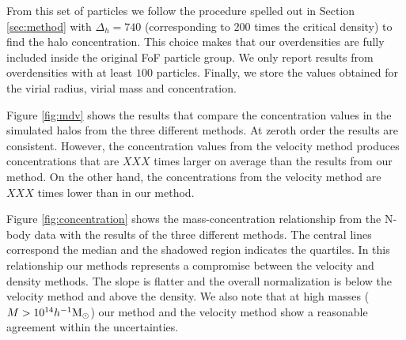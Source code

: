\documentclass{emulateapj}
\newcommand{\hMsun}{{\ifmmode{h^{-1}{\rm
        {M_{\odot}}}}\else{$h^{-1}{\rm{M_{\odot}}}$}\fi}}
\begin{document}
From this set of particles we follow the procedure spelled out in
Section \ref{sec:method} with $\Delta_h=740$  (corresponding to $200$
times the critical density) to find the halo concentration.
This choice makes that our overdensities are fully included inside the
original FoF particle group.
We only report results from overdensities with at least $100$ particles.
Finally, we store the values obtained for the virial radius, virial
mass and concentration.

Figure \ref{fig:mdv} shows the results that compare the concentration
values in the simulated halos from the three different methods.
At zeroth order the results are consistent.
However, the concentration values from the velocity method produces
concentrations that are $XXX$ times larger on average than the results
from our method.
On the other hand, the concentrations from the velocity method are
$XXX$ times lower than in our method.



Figure \ref{fig:concentration} shows the mass-concentration
relationship from the N-body data with the results of the three
different methods.
The central lines correspond the median and the
shadowed region indicates the quartiles.
In this relationship our methods represents a compromise between the
velocity and density methods.
The slope is flatter and the overall normalization is below the
velocity method and above the density.
We also note that at high masses ($M>10^{14}\hMsun$) our method
and the velocity method show a reasonable agreement within the
uncertainties.
\end{document}
